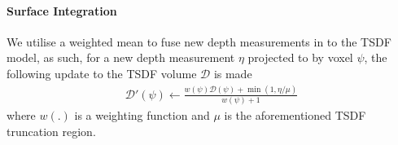 \paragraph{Surface Integration}
We utilise a weighted mean to fuse new depth measurements in to the TSDF model, as such, for a new depth measurement $\eta$ projected to by voxel $\psi$, 
the following update to the TSDF volume $\mathcal{D}$ is made
\begin{equation}
	\begin{split}
		\mathcal{D}'(\psi) \leftarrow \frac{w(\psi)\mathcal{D}(\psi) + \min(1, \eta/\mu)}{w(\psi) + 1}
	\end{split}
\end{equation}
where $w(.)$ is a weighting function and $\mu$ is the aforementioned TSDF truncation region.